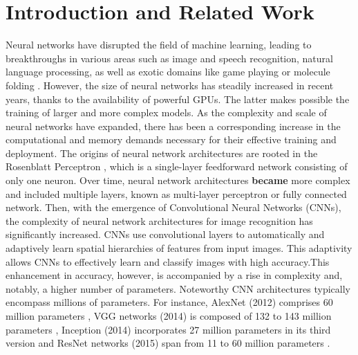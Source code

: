 \section{Introduction and Related Work}
Neural networks have disrupted the field of machine learning, leading to
breakthroughs in various areas such as image and speech recognition, natural
language processing, as well as exotic domains like game playing
\cite{silver2016mastering,silver2018general} or molecule folding
\cite{jumper2021highly}. However, the size of neural networks has steadily
increased in recent years, thanks to the availability of powerful \acp{GPU}. The
latter makes possible the training of larger and more complex models. As the
complexity and scale of neural networks have expanded, there has been a
corresponding increase in the computational and memory demands necessary for
their effective training and deployment. The origins of neural network
architectures are rooted in the Rosenblatt Perceptron
\cite{rosenblatt1958perceptron}, which is a single-layer feedforward network
consisting of only one neuron. Over time, neural network architectures
\textbf{became} more complex and included multiple layers, known as multi-layer
perceptron or fully connected network. Then, with the emergence of Convolutional
Neural Networks (CNNs), the complexity of neural network architectures for image
recognition has significantly increased. \acp{CNN} use convolutional layers to
automatically and adaptively learn spatial hierarchies of features from input
images. This adaptivity allows \acp{CNN} to effectively learn and classify
images with high accuracy.This enhancement in accuracy, however, is accompanied
by a rise in complexity and, notably, a higher number of parameters. Noteworthy
\ac{CNN} architectures typically encompass millions of parameters. For instance,
AlexNet (2012) comprises 60 million parameters
\cite{DBLP:conf/nips/KrizhevskySH12}, VGG networks (2014) is composed of 132 to
143 million parameters \cite{DBLP:journals/corr/SimonyanZ14a}, Inception (2014)
incorporates 27 million parameters in its third version
\cite{DBLP:conf/cvpr/SzegedyLJSRAEVR15} and ResNet networks (2015) span from 11
to 60 million parameters \cite{DBLP:conf/cvpr/HeZRS16}.\\

